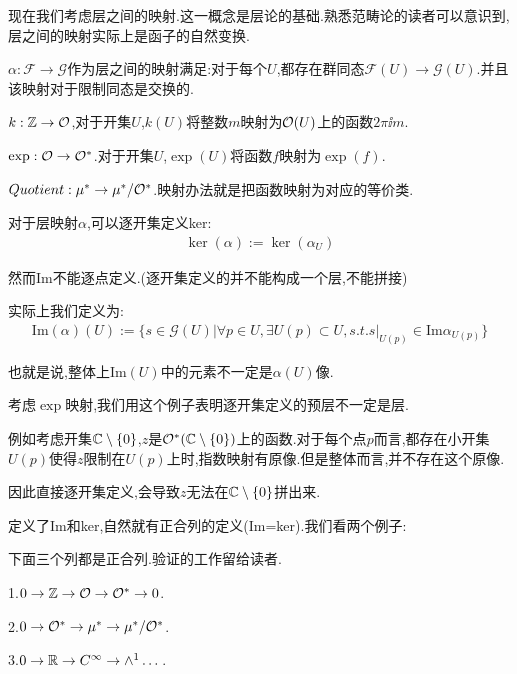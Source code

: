现在我们考虑层之间的映射.这一概念是层论的基础.熟悉范畴论的读者可以意识到,层之间的映射实际上是函子的自然变换.
\begin{definition}
	$\alpha:\mathcal{F}\to \mathcal{G}$作为层之间的映射满足:对于每个$U$,都存在群同态$\mathcal{F}(U)\to \mathcal{G}(U)$.并且该映射对于限制同态是交换的.
\end{definition}
\begin{example}
    \quad

	$k:\mathbb{Z} \to \mathcal{O}$,对于开集$U$,$k(U)$将整数$m$映射为$\mathcal{O}(U)$上的函数$2\pi \ii m$.

	$\exp:\mathcal{O} \to \mathcal{O}^*$.对于开集$U$,$\exp(U)$将函数$f$映射为$\exp (f)$. 

	$Quotient:\mu^* \to \mu^*/\mathcal{O}^*$.映射办法就是把函数映射为对应的等价类.
\end{example}
\begin{definition}[层映射的ker和Im]
	对于层映射$\alpha$,可以逐开集定义ker:
	\begin{align*}
		\ker(\alpha):=\ker(\alpha_U)
	\end{align*}

	然而Im不能逐点定义.(逐开集定义的并不能构成一个层,不能拼接)

	实际上我们定义为:
	\begin{align*}
		\mathrm{Im}(\alpha)(U):=\{s \in \mathcal{G}(U)|\forall p \in U,\exists U(p)\subset U,s.t.s|_{U(p)}\in \mathrm{Im}\alpha_{U(p)}\}
	\end{align*}

	也就是说,整体上Im$(U)$中的元素不一定是$\alpha(U)$像.
\end{definition}

考虑$\exp$映射,我们用这个例子表明逐开集定义的预层不一定是层.

例如考虑开集$\mathbb{C}\setminus \{0\}$,$z$是$\mathcal{O}^*(\mathbb{C}\setminus \{0\})$上的函数.对于每个点$p$而言,都存在小开集$U(p)$使得$z$限制在$U(p)$上时,指数映射有原像.但是整体而言,并不存在这个原像.

因此直接逐开集定义,会导致$z$无法在$\mathbb{C}\setminus \{0\}$拼出来.

定义了Im和ker,自然就有正合列的定义(Im=ker).我们看两个例子:
\begin{example}
    下面三个列都是正合列.验证的工作留给读者.

	1.$ 0\to \mathbb{Z} \to \mathcal{O} \to \mathcal{O}^* \to 0$.

	2.$0 \to \mathcal{O}^* \to \mu^* \to \mu^*/\mathcal{O}^*$.

	3.$0 \to \mathbb{R} \to C^\infty \to \wedge^1 \dots$.
\end{example}

